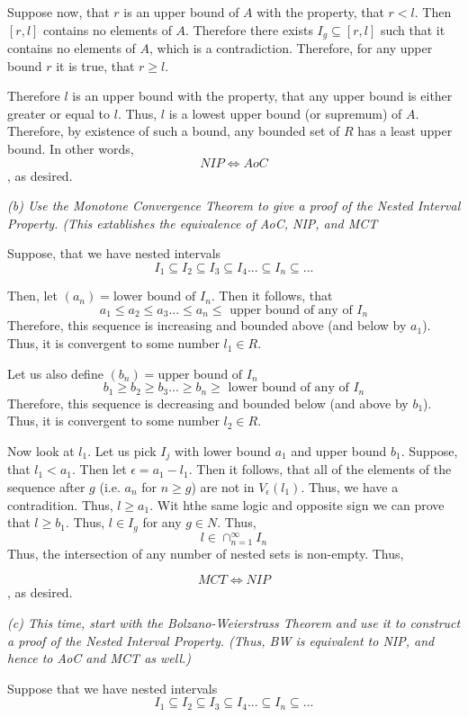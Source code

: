 \documentclass[11pt,oneside,titlepage]{book}
\begin{document}
Suppose now, that $r$ is an upper bound of $A$ with the property, that
$r < l$. Then $[r, l]$ contains no elements of $A$. Therefore there exists
$I_g \subseteq [r, l]$ such that it contains no elements of $A$,
which is a contradiction. Therefore, for any upper bound $r$ it is true, that
$r \geq l$.

Therefore $l$ is an upper bound with the property, that any  upper bound
is either greater or equal to $l$. Thus, $l$ is a lowest upper bound
(or supremum) of $A$. Therefore, by existence of such a bound,
any bounded set of $R$ has a least  upper bound. In other words,
$$NIP\iff AoC$$
, as desired.

\textit{(b) Use the Monotone Convergence Theorem to give a proof of the
  Nested Interval Property. (This extablishes the equivalence of AoC,
  NIP, and MCT}

Suppose, that we have nested intervals
$$I_1 \subseteq I_2 \subseteq I_3 \subseteq I_4 ... \subseteq I_n \subseteq ...$$

Then, let $(a_n) = \text{lower bound of }I_n$. Then it follows, that
$$a_1 \leq a_2 \leq a_3 ... \leq a_n \leq \text{ upper bound of any of } I_n$$
Therefore, this sequence is increasing  and bounded above (and below by $a_1$).
Thus, it is convergent to some number $l_1 \in R$.

Let us also define $(b_n) = \text{upper bound of }I_n$
$$b_1 \geq b_2 \geq b_3 ... \geq b_n \geq \text{ lower bound of any of } I_n$$
Therefore, this sequence is decreasing  and bounded below (and above by $b_1$).
Thus, it is convergent to some number $l_2 \in R$.

Now look at $l_1$. Let us pick $I_j$ with lower  bound $a_1$ and upper bound
$b_1$. Suppose, that $l_1 < a_1$. Then let $\epsilon = a_1 - l_1$. Then it
follows, that all of the elements of the sequence after $g$ (i.e. $a_n$ for $n \geq g$) are not in $V_\epsilon(l_1)$. Thus, we have a contradition. Thus,
$l \geq a_1$. Wit hthe same logic and opposite sign we can prove that
$l \geq b_1$. Thus, $l \in I_g$ for any $g \in N$. Thus,
$$l \in \cap_{n = 1}^{\infty}I_n$$
Thus, the intersection of any number of nested sets is non-empty. Thus,

$$MCT \iff NIP$$
, as desired.

\textit{(c) This time, start with the Bolzano-Weierstrass Theorem and
  use it to construct a proof of the Nested Interval Property. (Thus, BW
  is equivalent to NIP, and hence to AoC and MCT as well.)}

Suppose that we have nested intervals
$$I_1 \subseteq I_2 \subseteq I_3 \subseteq I_4 ... \subseteq I_n \subseteq ...$$
\end{document}

